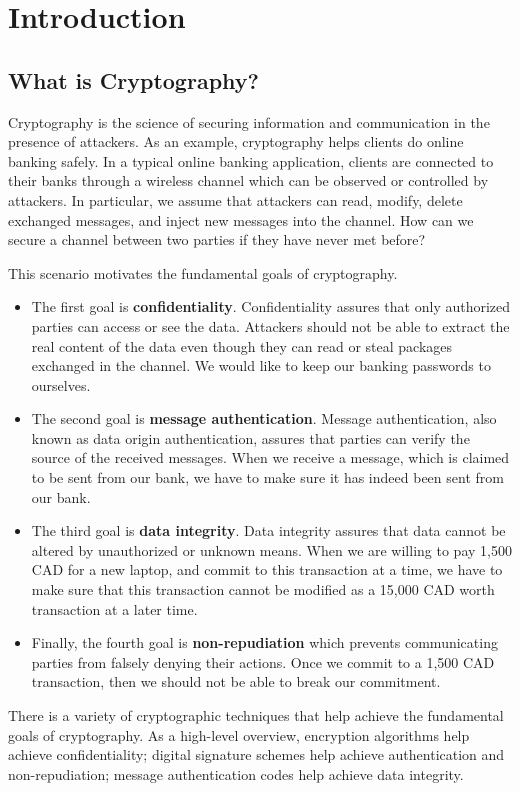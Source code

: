 \section{Introduction}

\subsection{What is Cryptography?}
Cryptography is the science of securing information and communication in the presence of attackers. As an example, cryptography helps clients do online banking safely. In a typical online banking application, clients are connected to their banks through a wireless channel which can be observed or controlled by attackers. In particular, we assume that attackers can read, modify, delete exchanged messages, and inject new messages into the channel. How can we secure a channel between two parties if they have never met before?

This scenario motivates the fundamental goals of cryptography.
\begin{itemize}
    \item The first goal is {\bf confidentiality}. Confidentiality assures that only authorized parties can access or see the data. Attackers should not be able to extract the real content of the data even though they can read or steal packages exchanged in the channel. We would like to keep our banking passwords to ourselves.
    \item The second goal is {\bf message authentication}. Message authentication, also known as data origin authentication, assures that parties can verify the source of the received messages. When we receive a message, which is claimed to be sent from our bank, we have to make sure it has indeed been sent from our bank.
    \item The third goal is {\bf data integrity}. Data integrity assures that data cannot be altered by unauthorized or unknown means. When we are willing to pay 1,500 CAD for a new laptop, and commit to this transaction at a time, we have to make sure that this transaction cannot be modified as a 15,000 CAD worth transaction at a later time.
    \item Finally, the fourth goal is {\bf non-repudiation} which prevents communicating parties from falsely denying their actions. Once we commit to a 1,500 CAD transaction, then we should not be able to break our commitment.
\end{itemize}

There is a variety of cryptographic techniques that help achieve the fundamental goals of cryptography. As a high-level overview, encryption algorithms help achieve confidentiality; digital signature schemes help achieve authentication and non-repudiation; message authentication codes help achieve data integrity.

